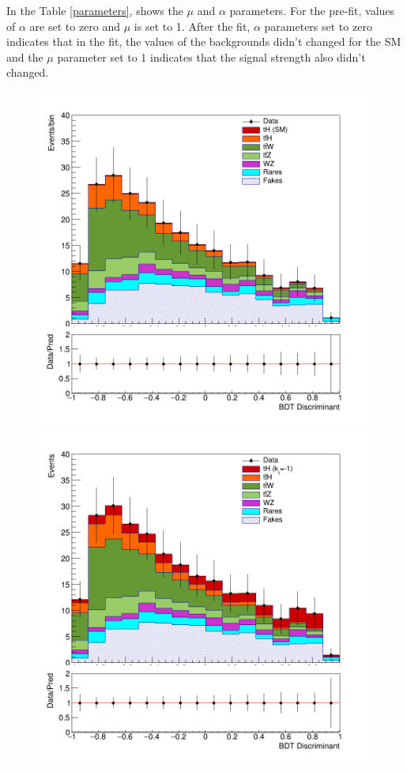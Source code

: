	In the Table \ref{parameters}, shows the $\mu$ and $\alpha$ parameters. For the pre-fit, values of $\alpha$ are set to zero and $\mu$ is set to 1. After the fit, $\alpha$ parameters set to zero indicates that in the fit, the values of the backgrounds didn't changed for the SM and the $\mu$ parameter set to 1 indicates that the signal strength also didn't changed.
	\pagebreak
	
		\begin{figure}[!htbp]
		\centering
		\begin{minipage}[b]{0.48\textwidth}
			\includegraphics[width=\textwidth]{Chapter4/simple.png}
		\end{minipage}
		\hfill
		\begin{minipage}[b]{0.48\textwidth}
			\includegraphics[width=\textwidth]{Chapter4/simple-kt-1.png}

\end{minipage}
\end{figure}
